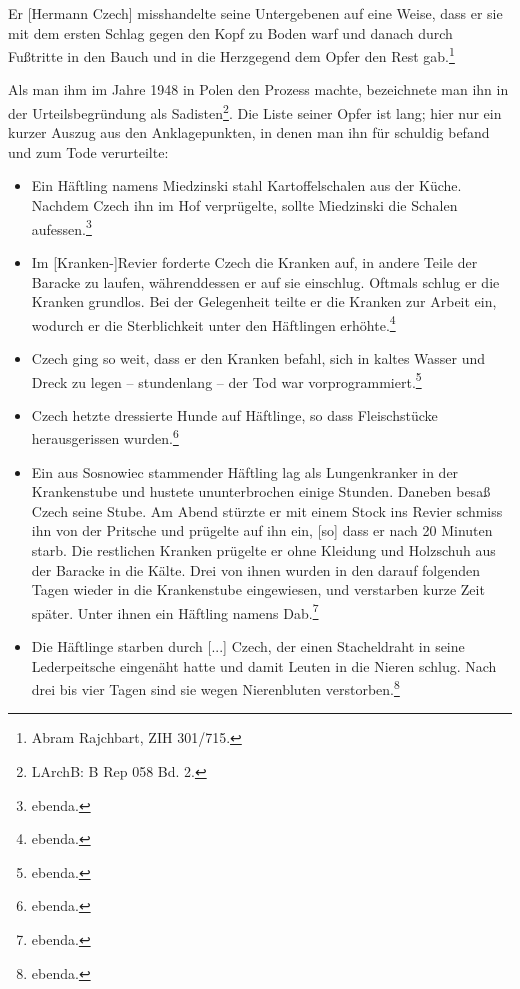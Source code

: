 \documentclass[a4paper,12pt,ngerman,
]{nisebook}
\begin{document}
\begin{leftbar}
Er [Hermann Czech] misshandelte seine Untergebenen auf eine Weise, dass er sie mit dem ersten Schlag gegen den Kopf zu Boden warf und danach durch Fußtritte in den Bauch und in die Herzgegend dem Opfer den Rest gab.\footnote{Abram Rajchbart, ZIH 301/715.}
\end{leftbar}

Als man ihm im Jahre 1948 in Polen den Prozess machte, bezeichnete man ihn in der Urteilsbegründung als Sadisten\footnote{LArchB: B Rep 058 Bd. 2.}. Die Liste seiner Opfer ist lang; hier nur ein kurzer Auszug aus den Anklagepunkten, in denen man ihn für schuldig befand und zum Tode verurteilte:
\begin{itemize}
\item{\glqq Ein Häftling namens Miedzinski stahl Kartoffelschalen aus der Küche. Nachdem Czech ihn im Hof verprügelte, sollte Miedzinski die Schalen aufessen.\grqq\footnote{ebenda.}}

\item{\glqq Im [Kranken-]Revier forderte Czech die Kranken auf, in andere Teile der Baracke zu laufen, währenddessen er auf sie einschlug. Oftmals schlug er die Kranken grundlos. Bei der Gelegenheit teilte er die Kranken zur Arbeit ein, wodurch er die Sterblichkeit unter den Häftlingen erhöhte.\grqq\footnote{ebenda.}}

\item{\glqq Czech ging so weit, dass er den Kranken befahl, sich in kaltes Wasser und Dreck zu legen -- stundenlang -- der Tod war vorprogrammiert.\grqq\footnote{ebenda.}}

\item{\glqq Czech hetzte dressierte Hunde auf Häftlinge, so dass Fleischstücke herausgerissen wurden.\grqq\footnote{ebenda.}}

\item{\glqq Ein aus Sosnowiec stammender Häftling lag als Lungenkranker in der Krankenstube und hustete ununterbrochen einige Stunden. Daneben besaß Czech seine Stube. Am Abend stürzte er mit einem Stock ins Revier schmiss ihn von der Pritsche und prügelte auf ihn ein, [so] dass er nach 20 Minuten starb. Die restlichen Kranken prügelte er ohne Kleidung und Holzschuh aus der Baracke in die Kälte. Drei von ihnen wurden in den darauf folgenden Tagen wieder in die Krankenstube eingewiesen, und verstarben kurze Zeit später. Unter ihnen ein Häftling namens Dab.\grqq\footnote{ebenda.}}

\item{\glqq Die Häftlinge starben durch [...] Czech, der einen Stacheldraht in seine Lederpeitsche eingenäht hatte und damit Leuten in die Nieren schlug. Nach drei bis vier Tagen sind sie wegen Nierenbluten verstorben.\grqq\footnote{ebenda.}}

\end{itemize}
\end{document}
